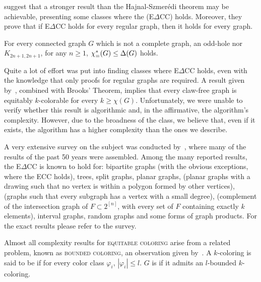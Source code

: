 \citep{e_delta_cc} suggest that a stronger result than the Hajnal-Szmerédi theorem may be achievable, presenting some classes where the  (E$\Delta$CC) holds.
Moreover, they prove that if E$\Delta$CC holds for every regular graph, then it holds for every graph.

\begin{conjecture*}[E$\Delta$CC]
    For every connected graph $G$ which is not a complete graph, an odd-hole nor $K_{2n+1, 2n+1}$, for any $n \geq 1$, $\chi_{\mathcal{=}}^*(G) \leq \Delta(G)$ holds.
\end{conjecture*}

Quite a lot of effort was put into finding classes where E$\Delta$CC holds, even with the knowledge that only proofs for regular graphs are required.
A result given by~\citep{claw_free_de_werra}, combined with Brooks' Theorem, implies that every claw-free graph is equitably $k$-colorable for every $k \geq \chi(G)$.
Unfortunately, we were unable to verify whether this result is algorithmic and, in the affirmative, the algorithm's complexity.
However, due to the broadness of the class, we believe that, even if it exists, the algorithm has a higher complexity than the ones we describe.

A very extensive survey on the subject was conducted by~\citep{equitable_survey}, where many of the results of the past 50 years were assembled.
Among the many reported results, the E$\Delta$CC is known to hold for:
bipartite graphs (with the obvious exceptions, where the ECC holds),
trees,
split graphs,
planar graphs,
 (planar graphs with a drawing such that no vertex is within a polygon formed by other vertices),
 (graphs such that every subgraph has a vertex with a small degree),
 (complement of the intersection graph of $F \subset 2^{[n]}$, with every set of $F$ containing exactly $k$ elements),
interval graphs,
random graphs and
some forms of graph products.
For the exact results please refer to the survey.

Almost all complexity results for \textsc{equitable coloring} arise from a related problem, known as \textsc{bounded coloring}, an observation given by~\citep{equitable_treewidth}.
A $k$-coloring is said to be  if for every color class $\varphi_i$, $|\varphi_i| \leq l$.
$G$ is  if it admits an $l$-bounded $k$-coloring.


